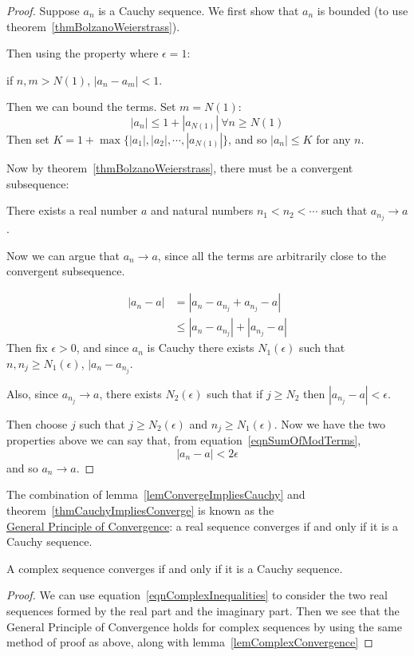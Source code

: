 \documentclass[../Main.tex]{subfiles}
\begin{document}
\begin{proof}
    Suppose $a_n$ is a Cauchy sequence. We first show that $a_n$ is bounded (to use theorem~\ref{thmBolzanoWeierstrass}).\par
    Then using the property where $\epsilon = 1$:\par
    if $n, m > N(1)$, $|a_n - a_m| < 1$.\par
    Then we can bound the terms. Set $m = N(1)$:
    \begin{equation*}
        |a_n| \leq 1 + |a_{N(1)}|~\forall n \geq N(1)
    \end{equation*}
    Then set $K = 1 + \max{\{|a_1|, |a_2|, \cdots, |a_{N(1)}|\}}$, and so $|a_n| \leq K$ for any $n$.\par
    Now by theorem~\ref{thmBolzanoWeierstrass}, there must be a convergent subsequence:\par
    There exists a real number $a$ and natural numbers $n_1 < n_2 < \cdots$ such that $a_{n_j} \to a$.\par
    Now we can argue that $a_n \to a$, since all the terms are arbitrarily close to the convergent subsequence.\par
    \begin{align}
        |a_n - a| &= |a_n - a_{n_j} + a_{n_j} - a| \nonumber \\
        &\leq |a_n - a_{n_j}| + |a_{n_j} - a| \label{eqnSumOfModTerms}
    \end{align}
    Then fix $\epsilon > 0$, and since $a_n$ is Cauchy there exists $N_1(\epsilon)$ such that $n, n_j \geq N_1(\epsilon)$, $|a_n - a_{n_j}$.\par
    Also, since $a_{n_j} \to a$, there exists $N_2(\epsilon)$ such that if $j \geq N_2$ then $|a_{n_j} - a| < \epsilon$.\par
    Then choose $j$ such that $j \geq N_2(\epsilon)$ and $n_j \geq N_1(\epsilon)$. Now we have the two properties above we can say that, from equation~\ref{eqnSumOfModTerms},
    \begin{equation*}
        |a_n - a| < 2 \epsilon
    \end{equation*}
    and so $a_n \to a$.
\end{proof}
The combination of lemma~\ref{lemConvergeImpliesCauchy} and theorem~\ref{thmCauchyImpliesConverge} is known as the \\ \underline{General Principle of Convergence}: a real sequence converges if and only if it is a Cauchy sequence.
\begin{corollary}
    A complex sequence converges if and only if it is a Cauchy sequence.
    \label{corComplexCauchyConvergence}
\end{corollary}
\begin{proof}
    We can use equation~\ref{eqnComplexInequalities} to consider the two real sequences formed by the real part and the imaginary part. Then we see that the General Principle of Convergence holds for complex sequences by using the same method of proof as above, along with lemma~\ref{lemComplexConvergence}
\end{proof}
\end{document}
